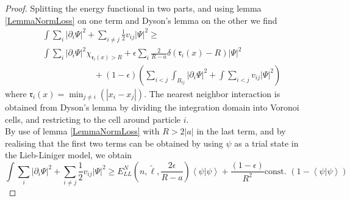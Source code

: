 \documentclass[a4paper,11pt]{article}
\newcommand{\abs}[1]{\left\lvert #1 \right\rvert}
\renewcommand{\braket}[1]{\left\langle#1\right\rangle}
\numberwithin{equation}{section}
\begin{document}
	\begin{proof}
		Splitting the energy functional in two parts, and using lemma \ref{LemmaNormLoss} on one term and Dyson's lemma on the other we find 
		\begin{equation}
		\begin{aligned}
		&\int \sum_{i}\abs{\partial_i\Psi}^2+\sum_{i\neq j} \frac{1}{2}v_{ij}\abs{\Psi}^2\geq\\ &\int\sum_{i}\abs{\partial_i\Psi}^2\chi_{\mathfrak{r}_i(x)>R}+\epsilon\sum_{i}\frac{2}{R-a}\delta(\mathfrak{r}_i(x)-R)\abs{\Psi}^2\\&\qquad\qquad\qquad+ (1-\epsilon)\left(\sum_{i<j}\int_{B_{ij}}\abs{\partial_i \Psi}^2+\int\sum_{i<j} v_{ij} \abs{\Psi}^2\right)
		\end{aligned}
		\end{equation}
		where $ \mathfrak{r}_i(x)=\min_{j\neq i}(\abs{x_i-x_j}) $. The nearest neighbor interaction is obtained from Dyson's lemma by dividing the integration domain into Voronoi cells, and restricting to the cell around particle $ i $.\\
		By use of lemma \ref{LemmaNormLoss} with $ R>2\abs{a} $ in the last term, and by realising that the first two terms can be obtained by using $ \psi $ as a trial state in the Lieb-Liniger model, we obtain\begin{equation}
		\int \sum_{i}\abs{\partial_i\Psi}^2+\sum_{i\neq j} \frac{1}{2}v_{ij}\abs{\Psi}^2\geq E_{LL}^N \left(n,\tilde{\ell},\frac{2\epsilon}{R-a}\right)\braket{\psi|\psi}+ \frac{(1-\epsilon)}{R^2}\text{const. }(1-\braket{\psi|\psi})
		\end{equation}
	\end{proof}
	
\end{document}
